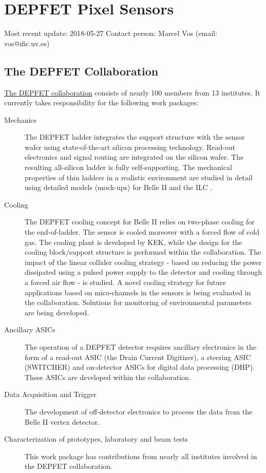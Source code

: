 \section{DEPFET Pixel Sensors}
\label{sec:DEPFET}
Most recent update: 2018-05-27
Contact person: Marcel Vos (email: vos@ific.uv.es)

\subsection{The DEPFET Collaboration}
\href{http://www.hll.mpg.de/twiki/bin/view/DEPFET/CollaborationList}{The DEPFET collaboration} consists of nearly 100 members from 13 institutes. It currently takes responsibility for the following work packages:
\begin{description}
\item[Mechanics] {The DEPFET ladder integrates the support structure with the sensor wafer using state-of-the-art silicon processing technology. Read-out electronics and signal routing are integrated on the silicon wafer. The resulting all-silicon ladder is fully self-supporting. The mechanical properties of thin ladders in a realistic environment are studied in detail using detailed models (mock-ups) for Belle II and the ILC .}
\item[Cooling] {The DEPFET cooling concept for Belle II relies on two-phase  cooling for the end-of-ladder. The sensor is cooled moreover with a forced flow of cold gas. The  cooling plant is developed by KEK, while the design for the cooling block/support structure is performed within the collaboration. The impact of the linear collider cooling strategy - based on reducing the power dissipated using a pulsed power supply to the detector and cooling through a forced air flow - is studied. A novel cooling strategy for future applications based on mico-channels in the sensors is being evaluated in the collaboration. Solutions for monitoring of environmental parameters are being developed.}
\item[Ancillary ASICs] {The operation of a DEPFET detector requires ancillary electronics in the form of a read-out ASIC (the Drain Current Digitizer), a steering ASIC (SWITCHER) and on-detector ASICs for digital data processing (DHP). These ASICs are developed within the collaboration.}
\item[Data Acquisition and Trigger] {The development of off-detector electronics to process the data from the Belle II vertex detector.}
\item[Characterization of prototypes, laboratory and beam tests] {This work package has contributions from nearly all institutes involved in the DEPFET collaboration.}
\end{description}

